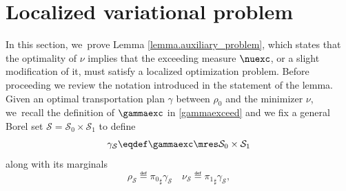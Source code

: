 \appendix

\section{Localized variational problem}\label{appendix.localized_variational_problem}
In this section, we~prove Lemma \ref{lemma.auxiliary_problem}, which states that the optimality of $\nu$ implies that the exceeding measure $\nuexc$, or a slight modification of it, must satisfy a localized optimization problem. Before proceeding we review the notation introduced in the statement of the lemma. Given an optimal transportation plan $\gamma$ between $\rho_0$ and the minimizer $\nu$, we~recall the definition of $\gammaexc$ in \eqref{gammaexceed} and we fix a general Borel set $\mathcal{S} = \mathcal{S}_0 \times \mathcal{S}_1$ to define
\[
\gamma_{\mathcal{S}} \eqdef \gammaexc \mres \mathcal{S}_0\times\mathcal{S}_1
\]
along with its marginals
\[
\rho_{\mathcal{S}} \eqdef {\pi_{0}}_\sharp\gamma_\mathcal{S}
\quad \nu_{\mathcal{S}} \eqdef {\pi_{1}}_\sharp\gamma_{\mathcal{S}},
\]

